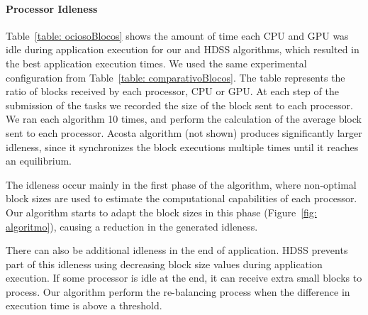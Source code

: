 \documentclass[journal]{IEEEtran}
\begin{document}
\paragraph{Processor Idleness} Table~\ref{table: ociosoBlocos} shows the amount of time each CPU and GPU was
idle during application execution for our and HDSS algorithms, which resulted in
the best application execution times. We used the same experimental
configuration from Table~\ref{table: comparativoBlocos}. The table represents the ratio of blocks received by each processor, CPU or GPU. At each step of the submission of the tasks we recorded the size of the block sent to each processor. We ran each algorithm 10 times, and perform the calculation of the average block sent to each processor.
Acosta algorithm (not
shown) produces significantly larger idleness, since it synchronizes the block
executions multiple times until it reaches an equilibrium.

The idleness occur mainly in the first phase of the algorithm, where
non-optimal block sizes are used to estimate the computational capabilities of
each processor. Our algorithm starts to adapt the block sizes in this phase
(Figure~\ref{fig: algoritmo}), causing a reduction in the generated idleness. 

There can also be additional idleness in the end of application. HDSS prevents
part of this idleness using decreasing block size values during application
execution. If some processor is idle at the end, it can receive extra small
blocks to process. Our algorithm perform the re-balancing process when the
difference in execution time is above a threshold. 




%	
\end{document}
